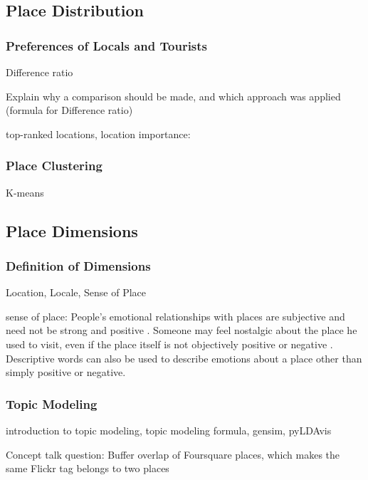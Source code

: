 \documentclass{article}
\begin{document}
\subsection{Place Distribution}
\subsubsection{Preferences of Locals and Tourists}
Difference ratio

Explain why a comparison should be made, and which approach was applied (formula for Difference ratio)

top-ranked locations, location importance: \cite{yin_diversified_2011}

\subsubsection{Place Clustering}
K-means

\subsection{Place Dimensions}
\subsubsection{Definition of Dimensions}
Location, Locale, Sense of Place

sense of place:
People's emotional relationships with places are subjective and need not be strong and positive \citep{altman_place_1992}. Someone may feel nostalgic about the place he used to visit, even if the place itself is not objectively positive or negative \cite{relph_geographical_1985}. Descriptive words can also be used to describe emotions about a place other than simply positive or negative.

\subsubsection{Topic Modeling}
introduction to topic modeling, topic modeling formula, gensim, pyLDAvis

Concept talk question: Buffer overlap of Foursquare places, which makes the same Flickr tag belongs to two places
\end{document}
